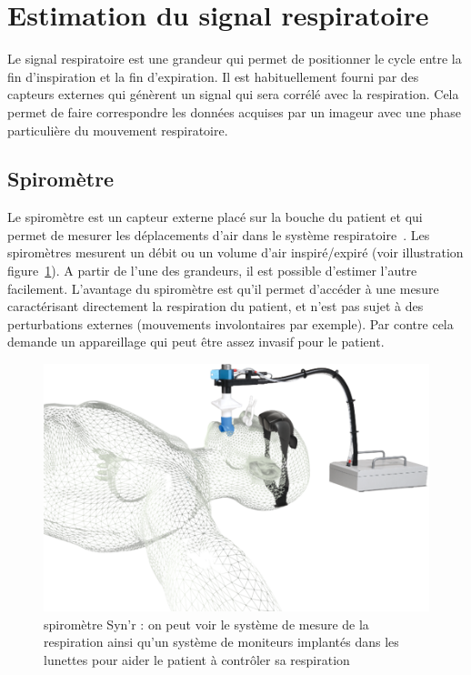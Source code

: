 \section{Estimation du signal respiratoire}

Le signal respiratoire est une grandeur qui permet de positionner le cycle entre la fin d'inspiration et la fin d'expiration. Il est habituellement fourni par des capteurs externes qui génèrent un signal qui sera corrélé avec la respiration. Cela permet de faire correspondre les données acquises par un imageur avec une phase particulière du mouvement respiratoire.

\subsection{Spiromètre}
\label{lab:spirometre}
Le spiromètre est un capteur externe placé sur la bouche du patient et qui permet de mesurer les déplacements d'air dans le système respiratoire~\cite{guivarc2004synchronization}. Les spiromètres mesurent un débit ou un volume d'air inspiré/expiré (voir illustration figure~\ref{fig:spirometre}). A partir de l'une des grandeurs, il est possible d'estimer l'autre facilement. L'avantage du spiromètre est qu'il permet d'accéder à une mesure caractérisant directement la respiration du patient, et n'est pas sujet à des perturbations externes (mouvements involontaires par exemple). Par contre cela demande un appareillage qui peut être assez invasif pour le patient.

\begin{figure}[h!]
	\begin{center}
		\includegraphics[width=12cm]{images/spiro}
	\end{center}
	\caption{spiromètre Syn'r : on peut voir le système de mesure de la respiration ainsi qu'un système de moniteurs implantés dans les lunettes pour aider le patient à contrôler sa respiration} 
	\label{fig:spirometre}
\end{figure}

